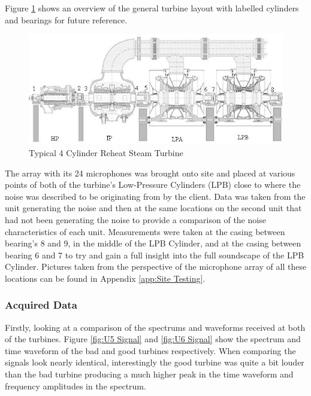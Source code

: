 \documentclass{UoNMCHA}
\numberwithin{equation}{section}
\begin{document}
    Figure \ref{fig:turbine} shows an overview of the general turbine layout with labelled cylinders and bearings for future reference.

    \begin{figure} [H]
        \centering
        \includegraphics[keepaspectratio, width = \textwidth]{Figures/LabelledTurbine.jpg}
        \caption{Typical 4 Cylinder Reheat Steam Turbine \citep{WWH}}
        \label{fig:turbine}
    \end{figure}


    The array with its 24 microphones was brought onto site and placed at various points of both of the turbine's Low-Pressure Cylinders (LPB) close to where the noise was described to be originating from by the client. Data was taken from the unit generating the noise and then at the same locations on the second unit that had not been generating the noise to provide a comparison of the noise characteristics of each unit. Measurements were taken at the casing between bearing's 8 and 9, in the middle of the LPB Cylinder, and at the casing between bearing 6 and 7 to try and gain a full insight into the full soundscape of the LPB Cylinder. Pictures taken from the perspective of the microphone array of all these locations can be found in Appendix \ref{app:Site Testing}.

    \subsubsection{Acquired Data} \label{sec:Site Acquired Data}

    Firstly, looking at a comparison of the spectrums and waveforms received at both of the turbines. Figure \ref{fig:U5 Signal} and \ref{fig:U6 Signal} show the spectrum and time waveform of the bad and good turbines respectively. When comparing the signals look nearly identical, interestingly the good turbine was quite a bit louder than the bad turbine producing a much higher peak in the time waveform and frequency amplitudes in the spectrum. 
\end{document}
